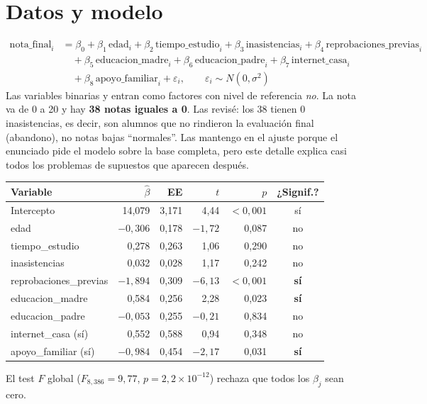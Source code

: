 \section*{Datos y modelo}
\begin{align*}
\text{nota\_final}_i&=\beta_0+\beta_1\,\text{edad}_i+\beta_2\,\text{tiempo\_estudio}_i
+\beta_3\,\text{inasistencias}_i+\beta_4\,\text{reprobaciones\_previas}_i\\
&\quad+\beta_5\,\text{educacion\_madre}_i+\beta_6\,\text{educacion\_padre}_i
+\beta_7\,\text{internet\_casa}_i\\
&\quad+\beta_8\,\text{apoyo\_familiar}_i+\varepsilon_i,
\qquad \varepsilon_i\sim N(0,\sigma^2)
\end{align*}
Las variables binarias  y  entran como factores con nivel de
referencia \textit{no}.
La nota va de 0 a 20 y hay \textbf{38 notas iguales a 0}. Las revisé: los 38 tienen 0 inasistencias,
es decir, son alumnos que no rindieron la evaluación final (abandono), no notas bajas ``normales''.
Las mantengo en el ajuste porque el enunciado pide el modelo sobre la base completa, pero este
detalle explica casi todos los problemas de supuestos que aparecen después.


\begin{center}\small
\begin{tabular}{lrrrrc}
\toprule
Variable & $\hat\beta$ & EE & $t$ & $p$ & ¿Signif.? \\ \midrule
Intercepto & 14,079 & 3,171 & 4,44 & $<0,001$ & sí \\
edad & $-0,306$ & 0,178 & $-1,72$ & 0,087 & no \\
tiempo\_estudio & 0,278 & 0,263 & 1,06 & 0,290 & no \\
inasistencias & 0,032 & 0,028 & 1,17 & 0,242 & no \\
reprobaciones\_previas & $-1,894$ & 0,309 & $-6,13$ & $<0,001$ & \textbf{sí} \\
educacion\_madre & 0,584 & 0,256 & 2,28 & 0,023 & \textbf{sí} \\
educacion\_padre & $-0,053$ & 0,255 & $-0,21$ & 0,834 & no \\
internet\_casa (sí) & 0,552 & 0,588 & 0,94 & 0,348 & no \\
apoyo\_familiar (sí) & $-0,984$ & 0,454 & $-2,17$ & 0,031 & \textbf{sí} \\ \bottomrule
\end{tabular}
\end{center}
El test $F$ global ($F_{8,386}=9,77$, $p=2,2\times10^{-12}$) rechaza que todos los $\beta_j$ sean cero.

